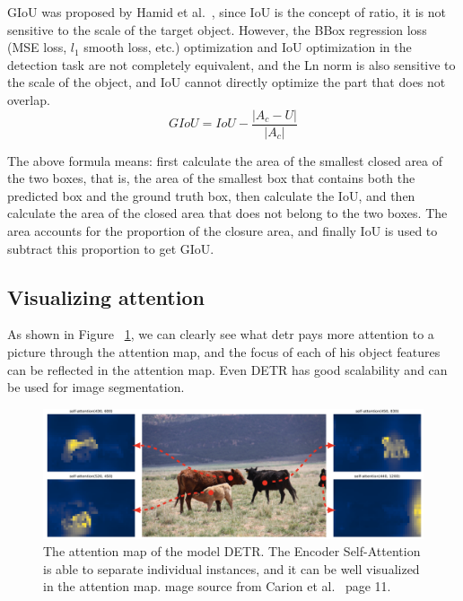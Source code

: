 GIoU was proposed by Hamid et al.~\cite{rezatofighi2019generalized}, since IoU is the concept of ratio, it is not sensitive to the scale of the target object. However, the BBox regression loss (MSE loss, $ l_1 $ smooth loss, etc.) optimization and IoU optimization in the detection task are not completely equivalent, and the Ln norm is also sensitive to the scale of the object, and IoU cannot directly optimize the part that does not overlap.
$$
G I o U=I o U-\frac{\left|A_{c}-U\right|}{\left|A_{c}\right|}
$$

The above formula means: first calculate the area of the smallest closed area of the two boxes, that is, the area of the smallest box that contains both the predicted box and the ground truth box, then calculate the IoU, and then calculate the area of the closed area that does not belong to the two boxes. The area accounts for the proportion of the closure area, and finally IoU is used to subtract this proportion to get GIoU.


\subsection{Visualizing attention}
As shown in Figure ~\ref{fig:detrattentionmap}, we can clearly see what detr pays more attention to a picture through the attention map, and the focus of each of his object features can be reflected in the attention map. Even DETR has good scalability and can be used for image segmentation.

\begin{figure}
	\centering
	\includegraphics[width=1\linewidth]{figures/detr_attention_map}
	\caption[The attention map of the model DETR]{The attention map of the model DETR. The Encoder Self-Attention is able to separate individual instances, and it can be well visualized in the attention map. mage source from Carion et al.~\cite{carion2020end} page 11.}
	\label{fig:detrattentionmap}
\end{figure}



\label{sec:rankingloss}
